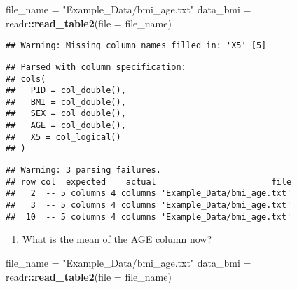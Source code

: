 \documentclass[]{article}
\newenvironment{Shaded}{\begin{snugshade}}{\end{snugshade}}
\newcommand{\DataTypeTok}[1]{\textcolor[rgb]{0.13,0.29,0.53}{#1}}
\newcommand{\DecValTok}[1]{\textcolor[rgb]{0.00,0.00,0.81}{#1}}
\newcommand{\KeywordTok}[1]{\textcolor[rgb]{0.13,0.29,0.53}{\textbf{#1}}}
\newcommand{\NormalTok}[1]{#1}
\newcommand{\OperatorTok}[1]{\textcolor[rgb]{0.81,0.36,0.00}{\textbf{#1}}}
\newcommand{\StringTok}[1]{\textcolor[rgb]{0.31,0.60,0.02}{#1}}
\providecommand{\tightlist}{%
  \setlength{\itemsep}{0pt}\setlength{\parskip}{0pt}}
\begin{document}
\begin{Shaded}
\begin{Highlighting}[]
\NormalTok{file_name =}\StringTok{ "Example_Data/bmi_age.txt"}
\NormalTok{data_bmi =}\StringTok{ }\NormalTok{readr}\OperatorTok{::}\KeywordTok{read_table2}\NormalTok{(}\DataTypeTok{file =}\NormalTok{ file_name)}
\end{Highlighting}
\end{Shaded}

\begin{verbatim}
## Warning: Missing column names filled in: 'X5' [5]
\end{verbatim}

\begin{verbatim}
## Parsed with column specification:
## cols(
##   PID = col_double(),
##   BMI = col_double(),
##   SEX = col_double(),
##   AGE = col_double(),
##   X5 = col_logical()
## )
\end{verbatim}

\begin{verbatim}
## Warning: 3 parsing failures.
## row col  expected    actual                       file
##   2  -- 5 columns 4 columns 'Example_Data/bmi_age.txt'
##   3  -- 5 columns 4 columns 'Example_Data/bmi_age.txt'
##  10  -- 5 columns 4 columns 'Example_Data/bmi_age.txt'
\end{verbatim}

\begin{Shaded}
\end{Shaded}

\begin{enumerate}
\def\labelenumi{\alph{enumi}.}
\setcounter{enumi}{2}
\tightlist
\item
  What is the mean of the AGE column now?
\end{enumerate}

\begin{Shaded}
\begin{Highlighting}[]
\NormalTok{file_name =}\StringTok{ "Example_Data/bmi_age.txt"}
\NormalTok{data_bmi =}\StringTok{ }\NormalTok{readr}\OperatorTok{::}\KeywordTok{read_table2}\NormalTok{(}\DataTypeTok{file =}\NormalTok{ file_name)}
\end{Highlighting}
\end{Shaded}
\end{document}
